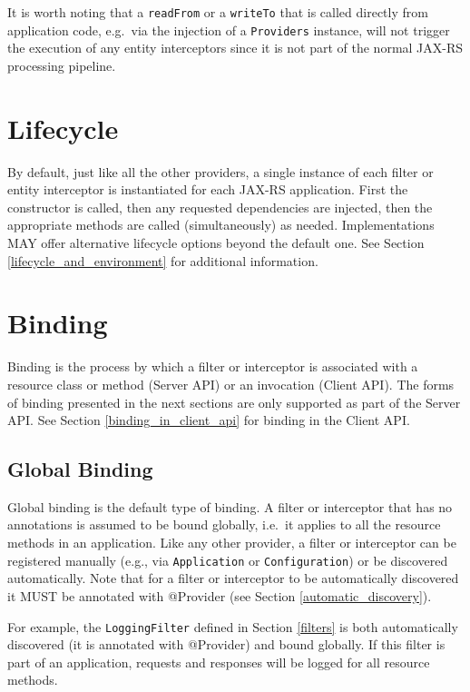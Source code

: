 It is worth noting that a \lstinline{readFrom} or a \lstinline{writeTo} that is called directly from application code,
e.g.~via the injection of a \lstinline{Providers} instance, will not trigger the execution of any entity interceptors
since it is not part of the normal JAX-RS processing pipeline.

\section{Lifecycle}

By default, just like all the other providers, \textcolor{highlight green}{a single instance of each filter or entity
interceptor is instantiated for each JAX-RS application}. First the constructor is called, then any requested
dependencies are injected, then the appropriate methods are called (simultaneously) as needed. Implementations MAY offer
alternative lifecycle options beyond the default one. See Section \ref{lifecycle_and_environment} for additional
information.

\section{Binding}

Binding is the process by which a filter or interceptor is associated with a resource class or method (Server API) or an
invocation (Client API). The forms of binding presented in the next sections are only supported as part of the Server
API. See Section \ref{binding_in_client_api} for binding in the Client API.

\subsection{Global Binding}
\label{global_binding}

Global binding is the default type of binding. A filter or interceptor that has no annotations is assumed to be bound
globally, i.e.~it applies to all the resource methods in an application. Like any other provider, a filter or
interceptor can be registered manually (e.g., via \lstinline{Application} or \lstinline{Configuration}) or be discovered
automatically. Note that \textcolor{highlight green}{for a filter or interceptor to be automatically discovered it MUST
be annotated with @Provider} (see Section \ref{automatic_discovery}).

For example, the \lstinline{LoggingFilter} defined in Section \ref{filters} is both automatically discovered (it is
annotated with @Provider) and bound globally. If this filter is part of an application, requests and responses will be
logged for all resource methods.

